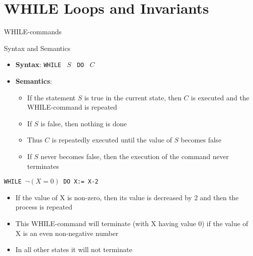 \section{WHILE Loops and Invariants}

\begin{frame}{WHILE-commands}
    \begin{block}{Syntax and Semantics}
        \begin{itemize}
            \item \textbf{Syntax}: \texttt{WHILE } $S$ \texttt{ DO } $C$
            \item \textbf{Semantics}:
            \begin{itemize}
                \item If the statement $S$ is true in the current state, then $C$ is executed and the WHILE-command is repeated
                \item If $S$ is false, then nothing is done
                \item Thus $C$ is repeatedly executed until the value of $S$ becomes false
                \item If $S$ never becomes false, then the execution of the command never terminates
            \end{itemize}
        \end{itemize}
    \end{block}
    
    \begin{example}
        \texttt{WHILE $\neg(X=0)$ DO X:= X-2}
        \begin{itemize}
            \item If the value of X is non-zero, then its value is decreased by 2 and then the process is repeated
            \item This WHILE-command will terminate (with X having value 0) if the value of X is an even non-negative number
            \item In all other states it will not terminate
        \end{itemize}
    \end{example}
\end{frame}

